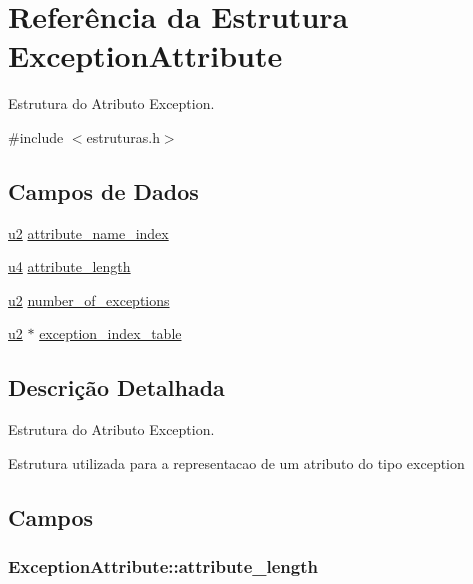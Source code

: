 \hypertarget{struct_exception_attribute}{}\section{Referência da Estrutura Exception\+Attribute}
\label{struct_exception_attribute}


Estrutura do Atributo Exception.  




{\ttfamily \#include $<$estruturas.\+h$>$}

\subsection*{Campos de Dados}
\begin{DoxyCompactItemize}
\item 
\hyperlink{estruturas_8h_a5f223212eef04d10a4550ded680cb1cf}{u2} \hyperlink{struct_exception_attribute_a0d10afce4ebfc218924ec98121e2a37f}{attribute\+\_\+name\+\_\+index}
\item 
\hyperlink{estruturas_8h_aedf6ddc03df8caaaccbb4c60b9a9b850}{u4} \hyperlink{struct_exception_attribute_ab07437f9c5ab9682f41d7a36e146ed8a}{attribute\+\_\+length}
\item 
\hyperlink{estruturas_8h_a5f223212eef04d10a4550ded680cb1cf}{u2} \hyperlink{struct_exception_attribute_a389b17447aa3278771d0649f1df66e69}{number\+\_\+of\+\_\+exceptions}
\item 
\hyperlink{estruturas_8h_a5f223212eef04d10a4550ded680cb1cf}{u2} $\ast$ \hyperlink{struct_exception_attribute_aa1607cc18ce94ce03891d766a380d041}{exception\+\_\+index\+\_\+table}
\end{DoxyCompactItemize}


\subsection{Descrição Detalhada}
Estrutura do Atributo Exception. 

Estrutura utilizada para a representacao de um atributo do tipo exception 

\subsection{Campos}
\subsubsection[{\texorpdfstring{attribute\+\_\+length}{attribute_length}}]{ Exception\+Attribute\+::attribute\+\_\+length}\hypertarget{struct_exception_attribute_ab07437f9c5ab9682f41d7a36e146ed8a}{}\label{struct_exception_attribute_ab07437f9c5ab9682f41d7a36e146ed8a}
